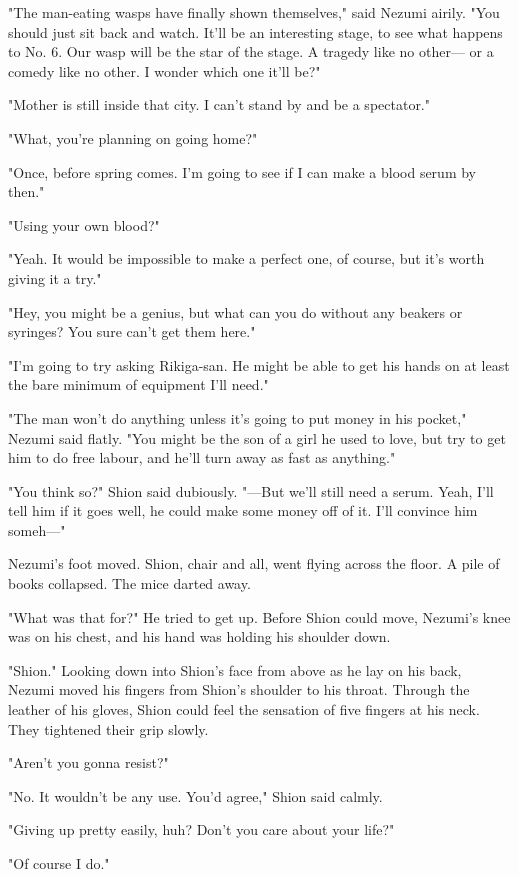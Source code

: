 "The man-eating wasps have finally shown themselves," said Nezumi
airily. "You should just sit back and watch. It'll be an interesting
stage, to see what happens to No. 6. Our wasp will be the star of the
stage. A tragedy like no other--- or a comedy like no other. I wonder
which one it'll be?"

"Mother is still inside that city. I can't stand by and be a spectator."

"What, you're planning on going home?"

"Once, before spring comes. I'm going to see if I can make a blood serum
by then."

"Using your own blood?"

"Yeah. It would be impossible to make a perfect one, of course, but it's
worth giving it a try."

"Hey, you might be a genius, but what can you do without any beakers or
syringes? You sure can't get them here."

"I'm going to try asking Rikiga-san. He might be able to get his hands
on at least the bare minimum of equipment I'll need."

"The man won't do anything unless it's going to put money in his
pocket," Nezumi said flatly. "You might be the son of a girl he used to
love, but try to get him to do free labour, and he'll turn away as fast
as anything."

"You think so?" Shion said dubiously. "---But we'll still need a serum.
Yeah, I'll tell him if it goes well, he could make some money off of it.
I'll convince him someh---"

Nezumi's foot moved. Shion, chair and all, went flying across the floor.
A pile of books collapsed. The mice darted away.

"What was that for?" He tried to get up. Before Shion could move,
Nezumi's knee was on his chest, and his hand was holding his shoulder
down.

"Shion." Looking down into Shion's face from above as he lay on his
back, Nezumi moved his fingers from Shion's shoulder to his throat.
Through the leather of his gloves, Shion could feel the sensation of
five fingers at his neck. They tightened their grip slowly.

"Aren't you gonna resist?"

"No. It wouldn't be any use. You'd agree," Shion said calmly.

"Giving up pretty easily, huh? Don't you care about your life?"

"Of course I do."


